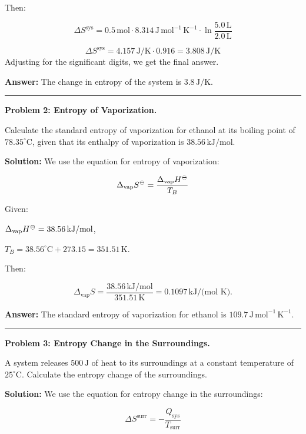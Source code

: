 \documentclass[
  9pt,
]{extbook}
\theoremstyle{definition}
\theoremstyle{definition}
\theoremstyle{definition}
\theoremstyle{remark}
\begin{document}
Then:

\[\Delta S^{\text{sys}} = 0.5\,\text{mol} \cdot 8.314\,\text{J} \, \text{mol}^{-1} \, \text{K}^{-1} \cdot \ln \frac{5.0\,\text{L}}{2.0\,\text{L}}\]

\[\Delta S^{\text{sys}} = 4.157\,\text{J/K} \cdot 0.916 = 3.808\,\text{J/K}\]
Adjusting for the significant digits, we get the final answer.

\textbf{Answer:} The change in entropy of the system is \(3.8\,\text{J/K}\).

\begin{center}\rule{0.5\linewidth}{0.5pt}\end{center}

\textbf{Problem 2: Entropy of Vaporization.}

Calculate the standard entropy of vaporization for ethanol at its boiling point of \(78.35^\circ\text{C}\), given that its enthalpy of vaporization is \(38.56\,\text{kJ/mol}\).

\textbf{Solution:} We use the equation for entropy of vaporization:

\[\Delta_{\text{vap}} S^{-\kern-6pt{\ominus}\kern-6pt-}= \frac{\Delta_{\text{vap}} H^{-\kern-6pt{\ominus}\kern-6pt-}}{T_B}\]

Given:

\(\Delta_{\text{vap}} H^{-\kern-6pt{\ominus}\kern-6pt-}= 38.56\,\text{kJ/mol}\),

\(T_B = 38.56^\circ\text{C}+273.15=351.51\,\text{K}\).

Then:

\[\Delta_{\text{vap}} S = \frac{38.56\,\text{kJ/mol}}{351.51\,\text{K}} = 0.1097\,\text{kJ/(mol K)}.\]

\textbf{Answer:} The standard entropy of vaporization for ethanol is \(109.7\,\text{J} \, \text{mol}^{-1} \, \text{K}^{-1}\).

\begin{center}\rule{0.5\linewidth}{0.5pt}\end{center}

\textbf{Problem 3: Entropy Change in the Surroundings.}

A system releases \(500\,\text{J}\) of heat to its surroundings at a constant temperature of \(25^\circ\text{C}\). Calculate the entropy change of the surroundings.

\textbf{Solution:} We use the equation for entropy change in the surroundings:

\[\Delta S^{\text{surr}} = -\frac{Q_{\text{sys}}}{T_{\text{surr}}}\]
\end{document}
